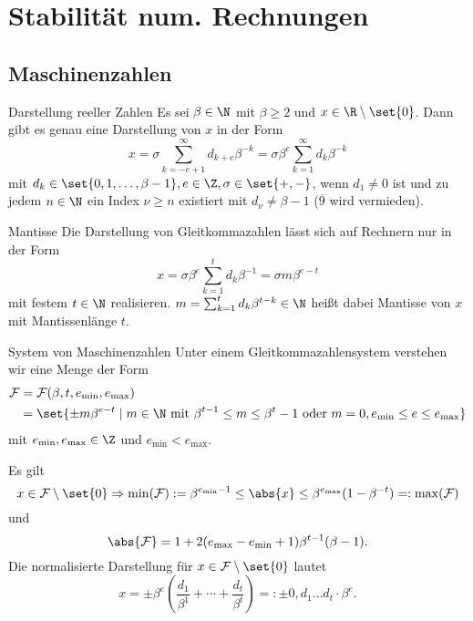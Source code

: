 \section{Stabilität num. Rechnungen}

\subsection*{Maschinenzahlen}

\begin{karte}{Darstellung reeller Zahlen}
    Es sei \( \beta \in \N \) mit \( \beta \geq 2 \) und \( x \in \R\setminus\set{0} \).
    Dann gibt es genau eine Darstellung von \( x \) in der Form 
    \[ x = \sigma \sum_{k= -e + 1}^\infty d_{k+e} \beta^{-k} = \sigma \beta^e \sum_{k=1}^\infty d_k \beta^{-k} \]
    mit \( d_k \in \set{ 0,1,\ldots, \beta - 1 }, e\in \Z, \sigma \in \set{+,-} \), 
    wenn \( d_1 \neq 0 \) ist und zu jedem \( n\in\N \) ein Index \( \nu \geq n \) 
    existiert mit \( d_\nu \neq \beta - 1 \) (\( \overline{9} \) wird vermieden).
\end{karte}

\begin{karte}{Mantisse}
    Die Darstellung von Gleitkommazahlen lässt sich auf Rechnern nur in der Form 
    \[ x = \sigma \beta^e \sum_{k=1}^t d_k \beta^{-1} = \sigma m \beta^{e-t} \]
    mit festem \(t\in\N\) realisieren. \( m = \sum_{k=1}^t d_k \beta^{t-k}\in \N \)
    heißt dabei Mantisse von \(x\) mit Mantissenlänge \(t\).
\end{karte}

\begin{karte}{System von Maschinenzahlen}
    Unter einem Gleitkommazahlensystem verstehen wir eine Menge der Form 
    \begin{align*}
        \mathcal{F} &= \mathcal{F}(\beta, t, e_{\min}, e_{\max}) \\
                    &= \set{ \pm m \beta^{e-t} \;|\; m\in\N 
                    \text{ mit } \beta^{t-1} \leq m \leq \beta^t - 1 \text{ oder }
                    m = 0, e_{\min} \leq e \leq e_{\max} }
    \end{align*}
    mit \( e_{\min}, e_{\max} \in\Z \) und \( e_{\min} < e_{\max} \).
    
    Es gilt 
    \[ x \in \mathcal{F} \setminus \set{0} \Rightarrow \min(\mathcal{F}) := \beta^{e_{\min} - 1} \leq \abs{x} \leq \beta^{e_{\max}}(1 - \beta^{-t}) =: \max(\mathcal{F}) \]
    und \[ \abs{ \mathcal{F} } = 1 + 2(e_{\max} - e_{\min} + 1)\beta^{t-1}(\beta - 1). \]
    Die normalisierte Darstellung für \( x \in \mathcal{F} \setminus \set{0} \) lautet
    \[ x = \pm \beta^e ( \frac{d_1}{\beta^1} + \cdots + \frac{d_t}{\beta^t} ) =: \pm 0,d_1 \ldots d_t \cdot \beta^e. \]
\end{karte}

